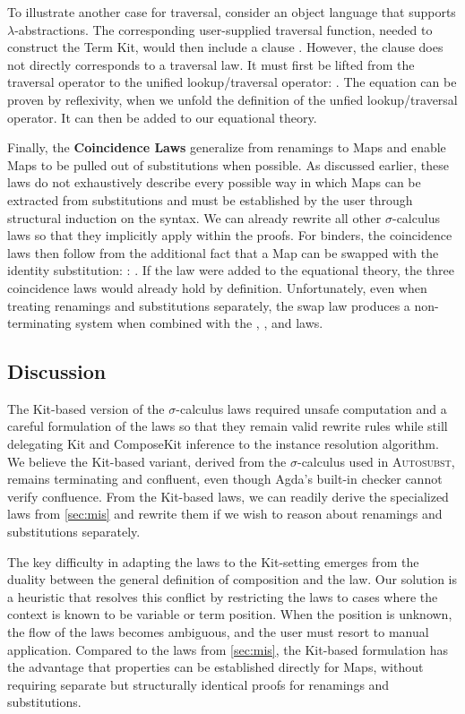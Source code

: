 \documentclass[screen,nonacm]{acmart}
\begin{document}
To illustrate another case for traversal, consider an object language that
supports $λ$-abstractions. The corresponding user-supplied traversal function,
needed to construct the Term Kit, would then include a clause \FSLambdaExT.
However, the clause does not directly corresponds to a traversal law. It must
first be lifted from the traversal operator to the unified lookup/traversal
operator: \FSLambdaExL. The equation can be proven by reflexivity, when we
unfold the definition of the unfied lookup/traversal operator. It can then be
added to our equational theory.

Finally, the \textbf{Coincidence Laws} generalize from renamings to Maps and
enable Maps to be pulled out of substitutions when possible. As discussed
earlier, these laws do not exhaustively describe every possible way in which
Maps can be extracted from substitutions and must be established by the user
through structural induction on the syntax. We can already rewrite all other
$\sigma$-calculus laws so that they implicitly apply within the proofs. For
binders, the coincidence laws then follow from the additional fact that a Map
can be swapped with the identity substitution:  :
\ANormId{}. If the  law were added to the equational theory,
the three coincidence laws would already hold by definition. Unfortunately,
even when treating renamings and substitutions separately, the swap law
produces a non-terminating system when combined with the
, , and
 laws.

\subsection{Discussion}
The Kit-based version of the $σ$-calculus laws required unsafe computation and
a careful formulation of the laws so that they remain valid rewrite rules while
still delegating Kit and ComposeKit inference to the instance resolution
algorithm. We believe the Kit-based variant, derived from the $σ$-calculus used
in \textsc{Autosubst}, remains terminating and confluent, even though Agda’s
built-in checker cannot verify confluence. From the Kit-based laws, we can
readily derive the specialized laws from \cref{sec:mis} and rewrite them if we
wish to reason about renamings and substitutions separately.

The key difficulty in adapting the laws to the Kit-setting emerges from the
duality between the general definition of composition  and
the  law. Our solution is a heuristic that resolves
this conflict by restricting the laws to cases where the context is known to be
variable or term position. When the position is unknown, the flow of the laws
becomes ambiguous, and the user must resort to manual application. Compared to
the laws from \cref{sec:mis}, the Kit-based formulation has the advantage that
properties can be established directly for Maps, without requiring separate but
structurally identical proofs for renamings and substitutions.
\end{document}
